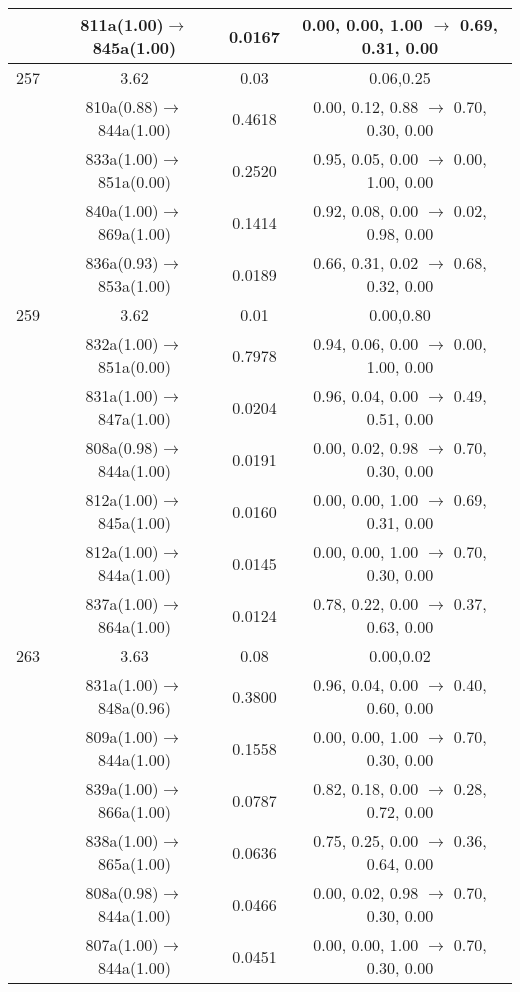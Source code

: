 \documentclass[10pt,a4paper]{article}
\begin{document}
\begin{longtable}{c|c|c|c}
 	& 811a(1.00)$\rightarrow$845a(1.00) &	 0.0167 &	 0.00, 0.00, 1.00 $\rightarrow$ 0.69, 0.31, 0.00 \\ 
 \hline257 &	 3.62 &	 0.03 &	 0.06,0.25 \\ 
  	& 810a(0.88)$\rightarrow$844a(1.00) &	 0.4618 &	 0.00, 0.12, 0.88 $\rightarrow$ 0.70, 0.30, 0.00 \\ 
 	& 833a(1.00)$\rightarrow$851a(0.00) &	 0.2520 &	 0.95, 0.05, 0.00 $\rightarrow$ 0.00, 1.00, 0.00 \\ 
 	& 840a(1.00)$\rightarrow$869a(1.00) &	 0.1414 &	 0.92, 0.08, 0.00 $\rightarrow$ 0.02, 0.98, 0.00 \\ 
 	& 836a(0.93)$\rightarrow$853a(1.00) &	 0.0189 &	 0.66, 0.31, 0.02 $\rightarrow$ 0.68, 0.32, 0.00 \\ 
 \hline259 &	 3.62 &	 0.01 &	 0.00,0.80 \\ 
  	& 832a(1.00)$\rightarrow$851a(0.00) &	 0.7978 &	 0.94, 0.06, 0.00 $\rightarrow$ 0.00, 1.00, 0.00 \\ 
 	& 831a(1.00)$\rightarrow$847a(1.00) &	 0.0204 &	 0.96, 0.04, 0.00 $\rightarrow$ 0.49, 0.51, 0.00 \\ 
 	& 808a(0.98)$\rightarrow$844a(1.00) &	 0.0191 &	 0.00, 0.02, 0.98 $\rightarrow$ 0.70, 0.30, 0.00 \\ 
 	& 812a(1.00)$\rightarrow$845a(1.00) &	 0.0160 &	 0.00, 0.00, 1.00 $\rightarrow$ 0.69, 0.31, 0.00 \\ 
 	& 812a(1.00)$\rightarrow$844a(1.00) &	 0.0145 &	 0.00, 0.00, 1.00 $\rightarrow$ 0.70, 0.30, 0.00 \\ 
 	& 837a(1.00)$\rightarrow$864a(1.00) &	 0.0124 &	 0.78, 0.22, 0.00 $\rightarrow$ 0.37, 0.63, 0.00 \\ 
 \hline263 &	 3.63 &	 0.08 &	 0.00,0.02 \\ 
  	& 831a(1.00)$\rightarrow$848a(0.96) &	 0.3800 &	 0.96, 0.04, 0.00 $\rightarrow$ 0.40, 0.60, 0.00 \\ 
 	& 809a(1.00)$\rightarrow$844a(1.00) &	 0.1558 &	 0.00, 0.00, 1.00 $\rightarrow$ 0.70, 0.30, 0.00 \\ 
 	& 839a(1.00)$\rightarrow$866a(1.00) &	 0.0787 &	 0.82, 0.18, 0.00 $\rightarrow$ 0.28, 0.72, 0.00 \\ 
 	& 838a(1.00)$\rightarrow$865a(1.00) &	 0.0636 &	 0.75, 0.25, 0.00 $\rightarrow$ 0.36, 0.64, 0.00 \\ 
 	& 808a(0.98)$\rightarrow$844a(1.00) &	 0.0466 &	 0.00, 0.02, 0.98 $\rightarrow$ 0.70, 0.30, 0.00 \\ 
 	& 807a(1.00)$\rightarrow$844a(1.00) &	 0.0451 &	 0.00, 0.00, 1.00 $\rightarrow$ 0.70, 0.30, 0.00 \\ 

\end{longtable}
\end{document}
